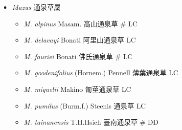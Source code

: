 
  \begin{itemize}
 \item[] \textit{Mazus} 通泉草屬
                                
  \begin{itemize}
        \item[] \textit{M. alpinus} Masam.  高山通泉草  \# LC
        \item[] \textit{M. delavayi} Bonati  阿里山通泉草   LC
        \item[] \textit{M. fauriei} Bonati  佛氏通泉草  \# LC
        \item[] \textit{M. goodenifolius} (Hornem.) Pennell  薄葉通泉草   LC
        \item[] \textit{M. miquelii} Makino  匍莖通泉草   LC
        \item[] \textit{M. pumilus} (Burm.f.) Steenis  通泉草   LC
        \item[] \textit{M. tainanensis} T.H.Hsieh  臺南通泉草  \# DD
  \end{itemize}
  \end{itemize}
